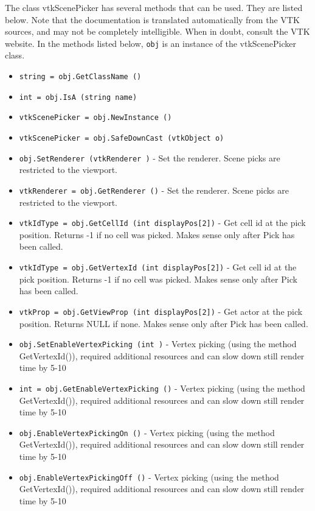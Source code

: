 The class vtkScenePicker has several methods that can be used.
  They are listed below.
Note that the documentation is translated automatically from the VTK sources,
and may not be completely intelligible.  When in doubt, consult the VTK website.
In the methods listed below, \verb|obj| is an instance of the vtkScenePicker class.
\begin{itemize}
\item  \verb|string = obj.GetClassName ()|

\item  \verb|int = obj.IsA (string name)|

\item  \verb|vtkScenePicker = obj.NewInstance ()|

\item  \verb|vtkScenePicker = obj.SafeDownCast (vtkObject o)|

\item  \verb|obj.SetRenderer (vtkRenderer )| -  Set the renderer. Scene picks are restricted to the viewport.

\item  \verb|vtkRenderer = obj.GetRenderer ()| -  Set the renderer. Scene picks are restricted to the viewport.

\item  \verb|vtkIdType = obj.GetCellId (int displayPos[2])| -  Get cell id at the pick position. 
 Returns -1 if no cell was picked. 
 Makes sense only after Pick has been called.

\item  \verb|vtkIdType = obj.GetVertexId (int displayPos[2])| -  Get cell id at the pick position. 
 Returns -1 if no cell was picked. 
 Makes sense only after Pick has been called.

\item  \verb|vtkProp = obj.GetViewProp (int displayPos[2])| -  Get actor at the pick position. 
 Returns NULL if none. 
 Makes sense only after Pick has been called.

\item  \verb|obj.SetEnableVertexPicking (int )| -  Vertex picking (using the method GetVertexId()), required 
 additional resources and can slow down still render time by
 5-10%

\item  \verb|int = obj.GetEnableVertexPicking ()| -  Vertex picking (using the method GetVertexId()), required 
 additional resources and can slow down still render time by
 5-10%

\item  \verb|obj.EnableVertexPickingOn ()| -  Vertex picking (using the method GetVertexId()), required 
 additional resources and can slow down still render time by
 5-10%

\item  \verb|obj.EnableVertexPickingOff ()| -  Vertex picking (using the method GetVertexId()), required 
 additional resources and can slow down still render time by
 5-10%

\end{itemize}
